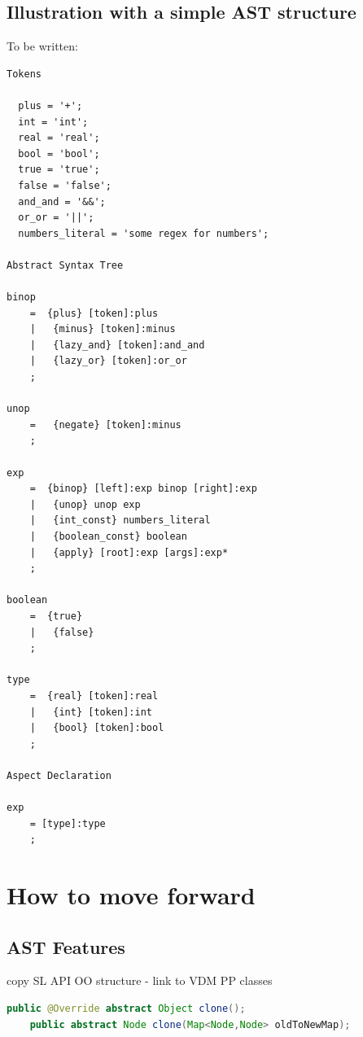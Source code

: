\documentclass{overturerep}
\begin{document}
\section{Illustration with a simple AST structure}
To be written:

\begin{lstlisting}
Tokens

  plus = '+';
  int = 'int';
  real = 'real';
  bool = 'bool';
  true = 'true';
  false = 'false';
  and_and = '&&';
  or_or = '||';
  numbers_literal = 'some regex for numbers';

Abstract Syntax Tree

binop
    =  {plus} [token]:plus
    |   {minus} [token]:minus
    |   {lazy_and} [token]:and_and
    |   {lazy_or} [token]:or_or
    ;
    
unop
    =   {negate} [token]:minus
    ;
    
exp
    =  {binop} [left]:exp binop [right]:exp
    |   {unop} unop exp
    |   {int_const} numbers_literal
    |   {boolean_const} boolean
    |   {apply} [root]:exp [args]:exp*
    ;
    
boolean
    =  {true}
    |   {false}
    ;
    
type
    =  {real} [token]:real
    |   {int} [token]:int
    |   {bool} [token]:bool
    ;

Aspect Declaration

exp 
    = [type]:type
    ;
\end{lstlisting}

\chapter{How to move forward}

\section{AST Features}

copy
SL API
OO structure - link to VDM PP classes

\begin{lstlisting}[language=java]
	public @Override abstract Object clone();
	public abstract Node clone(Map<Node,Node> oldToNewMap);
\end{lstlisting}




\end{document}
